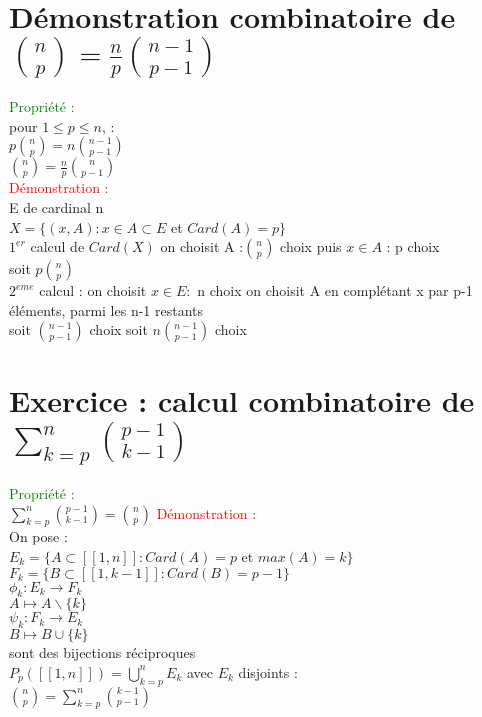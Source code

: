 \documentclass{article}
\begin{document}
\section{Démonstration combinatoire de $\binom{n}{p}= \frac n p \binom{n-1}{p-1}$}
\textcolor{green}{Propriété :} \\
pour $1 \leq p \leq n$, : \\
$p\binom{n}{p} = n \binom{n-1}{p-1}$ \\
$\binom n p = \frac n p \binom{n}{p-1}$ \\
\textcolor{red}{Démonstration : } \\
E de cardinal n \\
$X= \lbrace (x,A) : x \in A \subset E$ et $Card(A)=p \rbrace$ \\
$1^{er}$ calcul de $Card(X)$ on choisit A :$\binom{n}{p}$ choix puis $x\in A$ : p choix \\
soit $p \binom n p$ \\
$2^{eme}$ calcul : on choisit $x \in E :$ n choix on choisit A en complétant x par p-1 éléments, parmi les n-1 restants \\
soit $\binom{n-1}{p-1}$ choix soit $n\binom{n-1}{p-1}$ choix \\
\section{Exercice : calcul combinatoire de $\sum_{k=p}^n \binom{p-1}{k-1} $ }
\textcolor{green}{Propriété :} \\
$\sum_{k=p}^n \binom{p-1}{k-1}= \binom{n}{p} $
\textcolor{red}{Démonstration :} \\
On pose : \\
$E_k= \lbrace A \subset [[1,n]] : Card(A)=p$ et $max(A)=k \rbrace$ \\
$F_k=\lbrace B \subset [[1,k-1]] : Card(B)=p-1 \rbrace$ \\
$\phi_k : E_k \rightarrow F_k$ \\
$A \mapsto A \backslash \lbrace k \rbrace$ \\
$\psi_k : F_k \rightarrow E_k$ \\
$B \mapsto B \cup \lbrace k \rbrace $ \\
sont des bijections réciproques \\
$P_p([[ 1,n ]] )= \bigcup_{k=p}^n E_k$  avec $E_k$ disjoints : \\
$\binom{n}{p}= \sum^n_{k=p} \binom{k-1}{p-1}$
\end{document}
